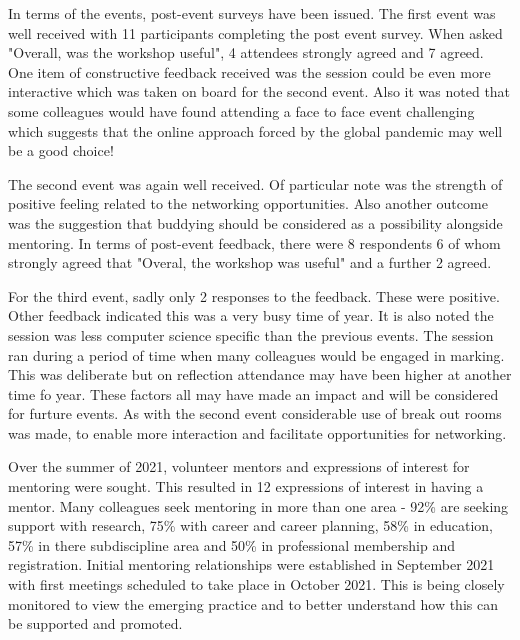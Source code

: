 \documentclass[sigconf]{acmart}
\begin{document}
In terms of the events, post-event surveys have been issued. The first event was well received with 11 participants completing the post event survey. When asked "Overall, was the workshop useful", 4 attendees strongly agreed and 7 agreed. One item of constructive feedback received was the session could be even more interactive which was taken on board for the second event. Also it was noted that some colleagues would have found attending a face to face event challenging which suggests that the online approach forced by the global pandemic may well be a good choice!

The second event was again well received. Of particular note was the strength of positive feeling related to the networking opportunities. Also another outcome was the suggestion that buddying should be considered as a possibility alongside mentoring. In terms of post-event feedback, there were 8 respondents 6 of whom strongly agreed that "Overal, the workshop was useful" and a further 2 agreed.

For the third event, sadly only 2 responses to the feedback. These were positive. Other feedback indicated this was a very busy time of year. It is also noted the session was less computer science specific than the previous events. The session ran during a period of time when many colleagues would be engaged in marking. This was deliberate but on reflection attendance may have been higher at another time fo year. These factors all may have made an impact and will be considered for furture events. As with the second event considerable use of break out rooms was made, to enable more interaction and facilitate opportunities for networking.

\begin{comment}
TO DO - evaluation of Mentoring - PH what is needed here? Is sufficient to indicate the first pilot of 10 Mentees has been established? Or do we need feedback from the participants?
\end{comment}

Over the summer of 2021, volunteer mentors and expressions of interest for mentoring were sought. This resulted in 12 expressions of interest in having a mentor. Many colleagues seek mentoring in more than one area - 92\% are seeking support with research, 75\% with career and career planning, 58\% in education, 57\% in there subdiscipline area and 50\% in professional membership and registration. Initial mentoring relationships were established in September 2021 with first meetings scheduled to take place in October 2021. This is being closely monitored to view the emerging practice and to better understand how this can be supported and promoted.
\end{document}
